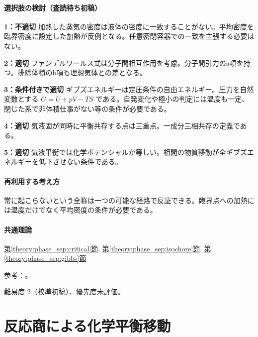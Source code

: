 \paragraph{選択肢の検討（査読待ち初稿）}\mbox{}\par

\noindent\textbf{1：不適切} 加熱した蒸気の密度は液体の密度に一致することがない。平均密度を臨界密度に設定した加熱が反例となる。任意密閉容器での一致を主張する必要はない。\par

\noindent\textbf{2：適切} ファンデルワールス式は分子間相互作用を考慮。分子間引力のa項を持つ。排除体積のb項も理想気体との差となる。\par

\noindent\textbf{3：条件付きで適切} ギブズエネルギーは定圧条件の自由エネルギー。圧力を自然変数とする \(G=U+pV-TS\) である。自発変化や極小の判定には温度も一定、閉じた系で非体積仕事がない等の条件が必要である。\par

\noindent\textbf{4：適切} 気液固が同時に平衡共存する点は三重点。一成分三相共存の定義である。\par

\noindent\textbf{5：適切} 気液平衡では化学ポテンシャルが等しい。相間の物質移動が全ギブズエネルギーを低下させない条件である。\par

\paragraph{再利用する考え方} 常に起こらないという全称は一つの可能な経路で反証できる。臨界点への加熱には温度だけでなく平均密度の条件が必要である。

\paragraph{共通理論} \hyperref[theory:phase_sep:critical]{第\ref*{theory:phase_sep:critical}節}, \hyperref[theory:phase_sep:isochore]{第\ref*{theory:phase_sep:isochore}節}, \hyperref[theory:phase_sep:gibbs]{第\ref*{theory:phase_sep:gibbs}節}

\par 参考：\cite{iapws95_2018}。

\par 難易度 2（校準初稿）、優先度未評価。

\section{反応商による化学平衡移動}

